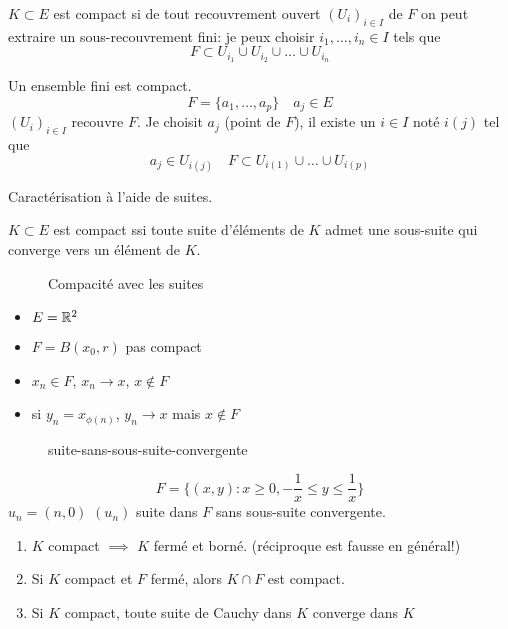 \begin{definition}
    $K \subset E$ est compact si de tout recouvrement ouvert $(U_i)_{i \in I}$ de $F$ on peut extraire un sous-recouvrement fini: je peux choisir  $i_1, \ldots, i_n \in I$ tels que 
    \[
    F \subset U_{i_1} \cup U_{i_2} \cup \ldots \cup U_{i_n}
    \] 
\end{definition}
\begin{property}
   Un ensemble fini est compact. 
   \[
       F = \{a_1, \ldots, a_p\} \quad a_j \in E
   \] 
   $(U_i)_{i \in I}$ recouvre $F$.
   Je choisit  $a_j$ (point de $F$), il existe un $i \in I$ noté  $i(j)$ tel que 
    \[
   a_j \in U_{i(j)} \quad F \subset U_{i(1)} \cup \ldots \cup U_{i(p)}
   \] 
\end{property}
\begin{theorem}
    Caractérisation à l'aide de suites. \par
    $K \subset E$ est compact ssi toute suite d'éléments de $K$ admet une sous-suite qui converge vers un élément de  $K$.
\end{theorem}
\begin{eg}
    \begin{figure}[H]
        \centering
        \caption{Compacité avec les suites}
        \label{fig:compactness-with-sequences}
    \end{figure}
    \begin{itemize}
        \item $E = \mathbb{R}^2$
        \item $F = B(x_0, r)$ pas compact
        \item $x_n \in F$,  $x_n \to x$, $x \not\in F$
        \item si $y_n = x_{\phi(n)}$, $y_n \to x$ mais $x \not\in F$
    \end{itemize}
\end{eg}
\begin{eg}
    
\begin{figure}[H]
    \centering
    \caption{suite-sans-sous-suite-convergente}
    \label{fig:suite-sans-sous-suite-convergente}
\end{figure}
\[
    F = \{(x, y): x \ge 0, -\frac{1}{x} \le y \le \frac{1}{x} \}
\] 
$u_n = (n, 0)$  $(u_n)$ suite dans  $F$ sans sous-suite convergente.
\end{eg}

\begin{prop}
    \begin{enumerate}
        \item $K$ compact $\implies$ $K$ fermé et borné. (réciproque est fausse en général!)
        \item Si $K$ compact et $F$ fermé, alors  $K \cap F$ est compact.
        \item Si $K$ compact, toute suite de Cauchy dans  $K$ converge dans  $K$
    \end{enumerate}
\end{prop}

